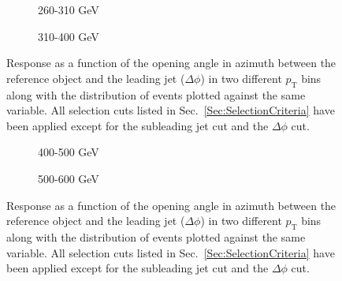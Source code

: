 \begin{figure}[!ht]
  \centering
  \begin{subfigure}{.5\textwidth}
    \centering
    \caption{260-310 GeV}
  \end{subfigure}%
  \begin{subfigure}{.5\textwidth}
    \centering
    \caption{310-400 GeV}
  \end{subfigure}
  \caption[Response as a function of the $\Delta\phi$ cut, 260-310 and 310-400 GeV bins]
  {\small Response as a function of the opening angle in azimuth between the reference object and the leading jet ($\Delta\phi$) in two different $p_{\mathrm T}$ bins along with the distribution of events plotted against the same variable.  All selection cuts listed in Sec.~\ref{Sec:SelectionCriteria} have been applied except for the subleading jet cut and the $\Delta\phi$ cut.  }
  \label{plot:GJetEMdPhi260-310_2016App}
\end{figure}

\begin{figure}[!ht]
  \centering
  \begin{subfigure}{.5\textwidth}
    \centering
    \caption{400-500 GeV}
  \end{subfigure}%
  \begin{subfigure}{.5\textwidth}
    \centering
    \caption{500-600 GeV}
  \end{subfigure}
  \caption[Response as a function of the $\Delta\phi$ cut, 400-500 and 500-600 GeV bins]
  {\small Response as a function of the opening angle in azimuth between the reference object and the leading jet ($\Delta\phi$) in two different $p_{\mathrm T}$ bins along with the distribution of events plotted against the same variable.  All selection cuts listed in Sec.~\ref{Sec:SelectionCriteria} have been applied except for the subleading jet cut and the $\Delta\phi$ cut.  }
  \label{plot:GJetEMdPhi400-500_2016App}
\end{figure}

